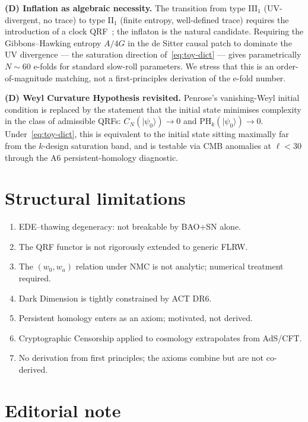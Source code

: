 \documentclass[epjc3,twocolumn]{svjour3}
\begin{document}
\smallskip\noindent\textbf{(D) Inflation as algebraic necessity.}
The transition from type III$_1$ (UV-divergent, no trace) to type II$_1$ (finite entropy, well-defined trace) requires the introduction of a clock QRF~\cite{CLPW2023}; the inflaton is the natural candidate. Requiring the Gibbons--Hawking entropy $A/4G$ in the de Sitter causal patch to dominate the UV divergence --- the saturation direction of~\eqref{eq:toy-dict} --- gives parametrically $N \sim 60$ e-folds for standard slow-roll parameters. We stress that this is an order-of-magnitude matching, not a first-principles derivation of the e-fold number.

\smallskip\noindent\textbf{(D) Weyl Curvature Hypothesis revisited.}
Penrose's vanishing-Weyl initial condition is replaced by the statement that the initial state minimises complexity in the class of admissible QRFs: $C_N(|\psi_0\rangle) \to 0$ and $\mathrm{PH}_k(|\psi_0\rangle) \to 0$. Under~\eqref{eq:toy-dict}, this is equivalent to the initial state sitting maximally far from the $k$-design saturation band, and is testable via CMB anomalies at $\ell < 30$ through the A6 persistent-homology diagnostic.

\section{Structural limitations}\label{sec:limits}

\begin{enumerate}
\item EDE--thawing degeneracy: not breakable by BAO+SN alone.
\item The QRF functor is not rigorously extended to generic FLRW.
\item The $(w_0, w_a)$ relation under NMC is not analytic; numerical treatment required.
\item Dark Dimension is tightly constrained by ACT DR6.
\item Persistent homology enters as an axiom; motivated, not derived.
\item Cryptographic Censorship applied to cosmology extrapolates from AdS/CFT.
\item No derivation from first principles; the axioms combine but are not co-derived.
\end{enumerate}

\section{Editorial note}\label{sec:editorial}
\end{document}
